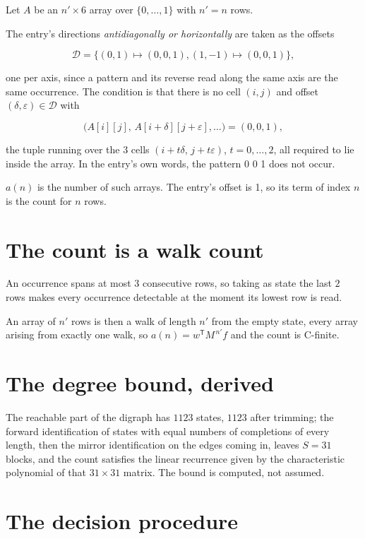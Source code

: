 \documentclass[11pt]{article}
\theoremstyle{definition}
\begin{document}
Let $A$ be an $n' \times 6$ array over $\{0,\dots,1\}$ with $n' = n$ rows.

The entry's directions {\itshape antidiagonally or horizontally} are taken as the offsets

\[\mathcal{D} = \{(0,1)\mapsto(0,0,1), (1,-1)\mapsto(0,0,1)\},\]

one per axis, since a pattern and its reverse read along the same axis are the same occurrence. The condition is that there is no cell $(i,j)$ and offset $(\delta,\varepsilon)\in\mathcal{D}$ with

\[\bigl(A[i][j],\,A[i{+}\delta][j{+}\varepsilon],\dots\bigr) = (0, 0, 1),\]

the tuple running over the $3$ cells $(i+t\delta,\,j+t\varepsilon)$, $t = 0,\dots,2$, all required to lie inside the array. In the entry's own words, the pattern 0 0 1 does not occur.

$a(n)$ is the number of such arrays. The entry's offset is 1, so its term of index $n$ is the count for $n$ rows.

\section{The count is a walk count}

An occurrence spans at most $3$ consecutive rows, so taking as state the last $2$ rows makes every occurrence detectable at the moment its lowest row is read.

An array of $n'$ rows is then a walk of length $n'$ from the empty state, every array arising from exactly one walk, so $a(n) = w^{\mathsf T}M^{\,n'}f$ and the count is C-finite.

\section{The degree bound, derived}

The reachable part of the digraph has $1123$ states, $1123$ after trimming; the forward identification of states with equal numbers of completions of every length, then the mirror identification on the edges coming in, leaves $S = 31$ blocks, and the count satisfies the linear recurrence given by the characteristic polynomial of that $31\times31$ matrix. The bound is computed, not assumed.

\section{The decision procedure}
\end{document}
